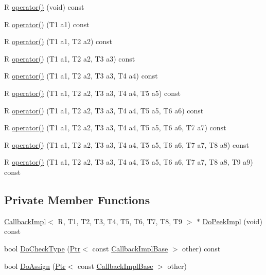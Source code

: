 {\bf }\par
\begin{DoxyCompactItemize}
\item 
R \hyperlink{classns3_1_1Callback_a9288be4e335ea165b87fd393300f620b}{operator()} (void) const 
\item 
R \hyperlink{classns3_1_1Callback_a5314a2eb805566d2ae9baff844fd0251}{operator()} (T1 a1) const 
\item 
R \hyperlink{classns3_1_1Callback_aa38d0dfd4fd8fa18495861e74ea7e05f}{operator()} (T1 a1, T2 a2) const 
\item 
R \hyperlink{classns3_1_1Callback_a2a54ef0c5599c57837366ecb41a67eee}{operator()} (T1 a1, T2 a2, T3 a3) const 
\item 
R \hyperlink{classns3_1_1Callback_a06009c9051bd58d8ae8b22ae611721a7}{operator()} (T1 a1, T2 a2, T3 a3, T4 a4) const 
\item 
R \hyperlink{classns3_1_1Callback_a94e68d07d7b94e234aba9930eb1b99ee}{operator()} (T1 a1, T2 a2, T3 a3, T4 a4, T5 a5) const 
\item 
R \hyperlink{classns3_1_1Callback_a3351281e80aebb61ad9f77d8e49090ea}{operator()} (T1 a1, T2 a2, T3 a3, T4 a4, T5 a5, T6 a6) const 
\item 
R \hyperlink{classns3_1_1Callback_a008def516af81ff06d71d84904e21c6e}{operator()} (T1 a1, T2 a2, T3 a3, T4 a4, T5 a5, T6 a6, T7 a7) const 
\item 
R \hyperlink{classns3_1_1Callback_a77a3533f4f614cccce486e95f00795c0}{operator()} (T1 a1, T2 a2, T3 a3, T4 a4, T5 a5, T6 a6, T7 a7, T8 a8) const 
\item 
R \hyperlink{classns3_1_1Callback_ae7a85ea360812771ac231ba9093443ac}{operator()} (T1 a1, T2 a2, T3 a3, T4 a4, T5 a5, T6 a6, T7 a7, T8 a8, T9 a9) const 
\end{DoxyCompactItemize}

\subsection*{Private Member Functions}
\begin{DoxyCompactItemize}
\item 
\hyperlink{classns3_1_1CallbackImpl}{Callback\+Impl}$<$ R, T1, T2, T3, T4, T5, T6, T7, T8, T9 $>$ $\ast$ \hyperlink{classns3_1_1Callback_a6241768ed91efaf9ff4ca81ef37671ae}{Do\+Peek\+Impl} (void) const 
\item 
bool \hyperlink{classns3_1_1Callback_a0f7d4a500f4e68cada2ae12d4fb99817}{Do\+Check\+Type} (\hyperlink{classns3_1_1Ptr}{Ptr}$<$ const \hyperlink{classns3_1_1CallbackImplBase}{Callback\+Impl\+Base} $>$ other) const 
\item 
bool \hyperlink{classns3_1_1Callback_a40b31032b5be1b88707232eef0243520}{Do\+Assign} (\hyperlink{classns3_1_1Ptr}{Ptr}$<$ const \hyperlink{classns3_1_1CallbackImplBase}{Callback\+Impl\+Base} $>$ other)
\end{DoxyCompactItemize}

